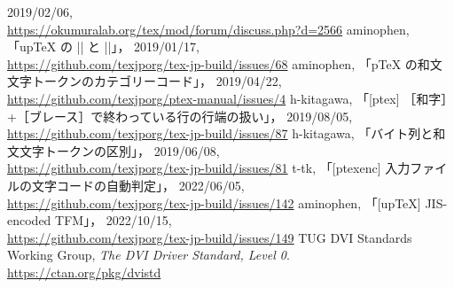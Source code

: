 \documentclass[a4paper,11pt,nomag,dvipdfmx]{jsarticle}
\begin{document}
\begin{thebibliography}{99}
  2019/02/06,\\
  \url{https://okumuralab.org/tex/mod/forum/discuss.php?d=2566}
  aminophen, 「upTeX の |\if| と |\ifcat|」，
  2019/01/17,\\
  \url{https://github.com/texjporg/tex-jp-build/issues/68}
  aminophen, 「pTeX の和文文字トークンのカテゴリーコード」，
  2019/04/22,\\
  \url{https://github.com/texjporg/ptex-manual/issues/4}
  h-kitagawa, 「[ptex] ［和字］+［ブレース］で終わっている行の行端の扱い」，
  2019/08/05,\\
  \url{https://github.com/texjporg/tex-jp-build/issues/87}
  h-kitagawa, 「バイト列と和文文字トークンの区別」，
  2019/06/08,\\
  \url{https://github.com/texjporg/tex-jp-build/issues/81}
  t-tk, 「[ptexenc] 入力ファイルの文字コードの自動判定」，
  2022/06/05,\\
  \url{https://github.com/texjporg/tex-jp-build/issues/142}
  aminophen, 「[upTeX] JIS-encoded TFM」，
  2022/10/15,\\
  \url{https://github.com/texjporg/tex-jp-build/issues/149}
  TUG DVI Standards Working Group,
  \textit{The DVI Driver Standard, Level 0}.\\
  \url{https://ctan.org/pkg/dvistd}
\end{thebibliography}

\newpage
\printindex
\end{document}
